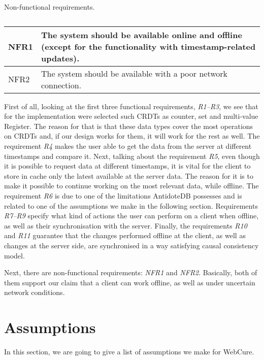 \begin{table}[!htbp]
\centering
\caption{Non-functional requirements.}
\label{table:req2}
\begin{tabular}{|p{1cm}|p{14cm}|}
\hline
NFR1 & The system should be available online and offline (except for the functionality with timestamp-related updates). \\ \hline
NFR2 & The system should be available with a poor network connection. \\ \hline
\end{tabular}
\caption*{}
\end{table} 

First of all, looking at the first three functional requirements, \textit{R1--R3}, we see that for the implementation were selected such CRDTs as counter, set and multi-value Register. The reason for that is that these data types cover the most operations on CRDTs and, if our design works for them, it will work for the rest as well. The requirement \textit{R4} makes the user able to get the data from the server at different timestamps and compare it. Next, talking about the requirement \textit{R5}, even though it is possible to request data at different timestamps, it is vital for the client to store in cache only the latest available at the server data. The reason for it is to make it possible to continue working on the most relevant data, while offline. The requirement \textit{R6} is due to one of the limitations AntidoteDB possesses and is related to one of the assumptions we make in the following section. Requirements \textit{R7--R9} specify what kind of actions the user can perform on a client when offline, as well as their synchronisation with the server. Finally, the requirements \textit{R10} and \textit{R11} guarantee that the changes performed offline at the client, as well as changes at the server side, are synchronised in a way satisfying causal consistency model. 

Next, there are non-functional requirements: \textit{NFR1} and \textit{NFR2}. Basically, both of them support our claim that a client can work offline, as well as under uncertain network conditions. 

\section{Assumptions}
\label{4-Assumptions}

In this section, we are going to give a list of assumptions we make for WebCure. 

